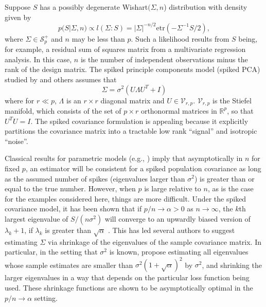 \documentclass[12pt]{article}
\newcommand{\bl}[1]{{\mathbf #1}}
\newcommand{\etr}{\text{etr}}
\begin{document}
Suppose $S$ has a possibly degenerate Wishart$(\Sigma,n$)
distribution with density given by
\begin{equation} 
p(S | \Sigma, n) \propto l(\Sigma: S) =  |\Sigma|^{-n/2} \text{etr}( - \Sigma^{-1}  S/2 ) ,  
\label{eqn:lik}
\end{equation}
%
\noindent where $\Sigma \in \mathcal S_p^+$ and $n$ may be less than $p$.  Such
a likelihood results from $S$ being, for example, a residual sum
of squares matrix from a multivariate regression analysis. In this
case, $n$ is the number of independent observations minus the rank of
the design matrix.  The spiked principle components model (spiked PCA)
studied by \citet{Johnstone2001} and others assumes that
\begin{equation} 
\Sigma = \sigma^2 ( U  \Lambda  U^T  + I )
\label{eqn:spiked}
\end{equation}
%
\noindent where for $r \ll p$, $\Lambda$ is an $r\times r$ diagonal
matrix and $U \in \mathcal V_{r,p}$.  $\mathcal V_{r,p}$ is the
Stiefel manifold, which consists of the set of $p \times r$
orthonormal matrices in $\mathbb{R}^p$, so that $U^TU =
I$.  The spiked covariance formulation is appealing because it explicitly
partitions the covariance matrix into a tractable low rank ``signal''
and isotropic ``noise''.


Classical results for parametric models (e.g., \citet{Schwartz1965})
imply that asymptotically in $n$ for fixed $p$, an estimator will be
consistent for a spiked population covariance as long as the assumed
number of spikes (eigenvalues larger than $\sigma^2$) is greater than
or equal to the true number.  However, when $p$ is large relative to
$n$, as is the case for the examples considered here, things are more
difficult.  Under the spiked covariance model, it has been shown that
if $p/n \rightarrow \alpha >0$ as $n\rightarrow \infty$, the $k$th
largest eigenvalue of $S/(n\sigma^2)$ will converge to an upwardly
biased version of $\lambda_{k}+1$, if $\lambda_k$ is greater than
$\sqrt{\alpha}$ \citep{Baik2006, Paul2007} .  This has led several
authors to suggest estimating $\Sigma$ via shrinkage of the
eigenvalues of the sample covariance matrix. In particular, in the
setting that $\sigma^2$ is known, \citet{Donoho2013} propose
estimating all eigenvalues whose sample estimates are smaller than
$\sigma^2(1+\sqrt{\alpha})^2$ by $\sigma^2$, and shrinking the larger
eigenvalues in a way that depends on the particular loss function
being used.  These shrinkage functions are shown to be asymptotically
optimal in the $p/n\rightarrow \alpha$ setting.  
\end{document}
